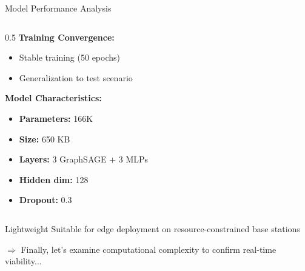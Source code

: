 \documentclass[aspectratio=169]{beamer}
\begin{document}
\begin{frame}{Model Performance Analysis}
\begin{columns}
        \begin{column}{0.5\textwidth}
            \textbf{Training Convergence:}
            \begin{itemize}
                \item Stable training (50 epochs)
            
                \item Generalization to test scenario
            \end{itemize}
            
           
            
            \textbf{Model Characteristics:}
            \begin{itemize}
                \item \textbf{Parameters:} 166K
                \item \textbf{Size:} 650 KB
                \item \textbf{Layers:} 3 GraphSAGE + 3 MLPs
                \item \textbf{Hidden dim:} 128
                \item \textbf{Dropout:} 0.3
            \end{itemize}
            \end{column}
    \end{columns}
            
            \begin{alertblock}{Lightweight}
                Suitable for edge deployment on resource-constrained base stations
            \end{alertblock}
        
    \vspace{0.2cm}
    \small \textcolor{iiitblue}{$\Rightarrow$ Finally, let's examine computational complexity to confirm real-time viability...}
\end{frame}
\end{document}
